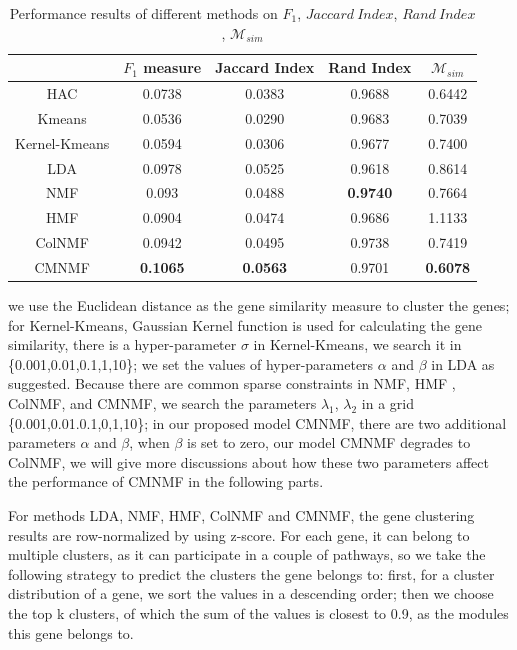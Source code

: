 \documentclass{bmcart}
\begin{document}
\begin{table}[!t]
\centering
\caption{Performance results of different methods on $F_1$, $Jaccard\ Index$, $Rand\ Index$, $\mathcal{M}_{sim}$}\label{tab:measurements}
\begin{tabular}{c|cccc}
\hline
&$F_1$ measure &Jaccard Index& Rand Index&$\mathcal{M}_{sim}$\\
\hline
HAC&0.0738&0.0383&0.9688&0.6442\\
Kmeans&0.0536&0.0290&0.9683&0.7039\\
Kernel-Kmeans&0.0594&0.0306&0.9677&0.7400\\
LDA&0.0978&0.0525&0.9618&0.8614\\
NMF&0.093&0.0488&\textbf{0.9740}&0.7664\\
HMF&0.0904&0.0474&0.9686&1.1133\\
ColNMF&0.0942&0.0495&0.9738&0.7419\\
CMNMF&\textbf{0.1065}& \textbf{0.0563}&{0.9701}& \textbf{0.6078}\\
\hline
\end{tabular}
\end{table}


we use the Euclidean distance as the gene similarity measure to cluster the genes; for Kernel-Kmeans, Gaussian Kernel function is used for calculating the gene similarity, there is a hyper-parameter $\sigma$ in Kernel-Kmeans, we search it in \{0.001,0.01,0.1,1,10\}; we set the values of hyper-parameters $\alpha$ and $\beta$ in LDA as \cite{Wei2006} suggested. Because there are common sparse constraints in NMF, HMF , ColNMF, and CMNMF, we search the parameters $\lambda_1$, $\lambda_2$ in a grid \{0.001,0.01.0.1,0,1,10\}; in our proposed model CMNMF, there are two additional parameters $\alpha$ and $\beta$, when $\beta$ is set to zero, our model CMNMF degrades to ColNMF, we will give more discussions about how these two parameters affect the performance of CMNMF in the following parts.



For methods LDA, NMF, HMF, ColNMF and CMNMF, the gene clustering results are row-normalized by using z-score. For each gene, it can belong to multiple clusters, as it can participate in a couple of pathways, so we take the following strategy to predict the clusters the gene belongs to: first, for a cluster distribution of a gene, we sort the values in a descending order; then we choose the top k clusters, of which the sum of the values is closest to 0.9, as the modules this gene belongs to.
\end{document}
